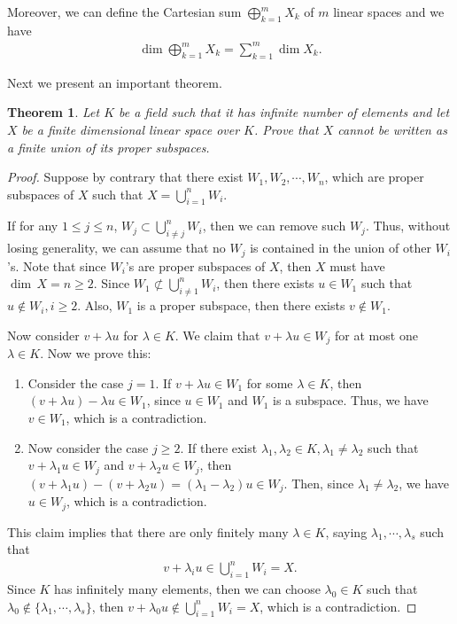 \documentclass[11pt]{book}
\newtheorem{theorem}{Theorem}[chapter]
\theoremstyle{definition}
\numberwithin{equation}{chapter}
\begin{document}
Moreover, we can define the Cartesian sum $\bigoplus^m_{k=1}X_k$ of $m$ linear spaces and we have 
\begin{align*}
    \dim  \bigoplus^m_{k=1}X_k = \sum^m_{k=1}\dim  X_k.
\end{align*}

\medskip

Next we present an important theorem.

\medskip

\begin{theorem}
Let $K$ be a field such that it has infinite number of elements and let $X$ be a finite dimensional linear space over $K$. Prove that $X$ cannot be written as a finite union of its proper subspaces.
\end{theorem}
\begin{proof}
Suppose by contrary that there exist $W_1, W_2,\cdots, W_n$, which are proper subspaces of $X$ such that $X = \bigcup^n_{i=1}W_i$. 

If for any $1\leq j\leq n$, $W_j\subset \bigcup^n_{i\neq j}W_i$, then we can remove such $W_j$. Thus, without losing generality, we can assume that no $W_j$ is contained in the union of other $W_i$'s. Note that since $W_i$'s are proper subspaces of $X$, then $X$ must have $ \dim \,X = n \geq 2$. Since $W_1\not\subset \bigcup^n_{i\neq 1}W_i$, then there exists $u\in W_1$ such that $u\notin W_i, i\geq 2$. Also, $W_1$ is a proper subspace, then there exists $v\notin W_1$. 

Now consider $v + \lambda u$ for $\lambda\in K$. We claim that $v + \lambda u\in W_j$ for at most one $\lambda\in K$. Now we prove this:
\begin{enumerate}[label=(\alph*)]
    \item Consider the case $j=1$. If $v + \lambda u\in W_1$ for some $\lambda\in K$, then $(v + \lambda u) - \lambda u\in W_1$, since $u\in W_1$ and $W_1$ is a subspace. Thus, we have $v\in W_1$, which is a contradiction.
    \item Now consider the case $j\geq 2$. If there exist $\lambda_1, \lambda_2\in K, \lambda_1\neq\lambda_2$ such that $v+\lambda_1 u\in W_j$ and $v+\lambda_2 u\in W_j$, then $(v+\lambda_1 u) - (v+\lambda_2 u) = (\lambda_1 - \lambda_2)u \in W_j$. Then, since $\lambda_1\neq\lambda_2$, we have $u\in W_j$, which is a contradiction.
\end{enumerate}

This claim implies that there are only finitely many $\lambda\in K$, saying $\lambda_1, \cdots, \lambda_s$ such that 
\begin{align*}
    v+\lambda_i u \in \bigcup^n_{i=1}W_i = X.
\end{align*}
Since $K$ has infinitely many elements, then we can choose $\lambda_0\in K$ such that $\lambda_0\notin \{\lambda_1, \cdots, \lambda_s\}$, then $v+\lambda_0 u\notin \bigcup^n_{i=1}W_i = X$, which is a contradiction.
\end{proof}
\end{document}
